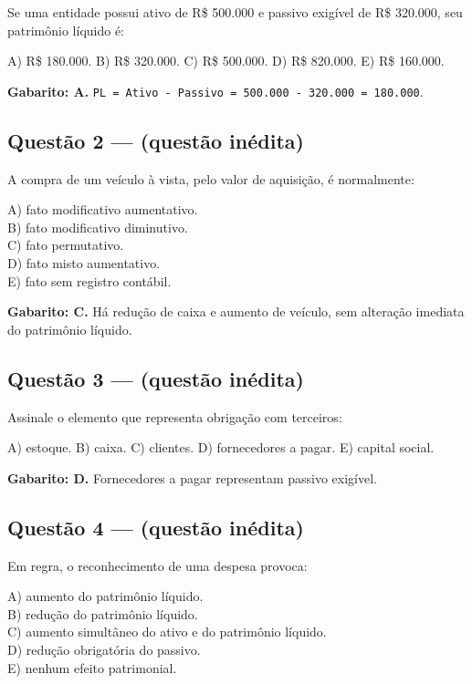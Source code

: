 \documentclass[11pt,a4paper]{article}
\begin{document}
Se uma entidade possui ativo de R\$ 500.000 e passivo exigível de R\$ 320.000, seu patrimônio líquido é:

A) R\$ 180.000. B) R\$ 320.000. C) R\$ 500.000. D) R\$ 820.000. E) R\$ 160.000.

\begin{alerta}
\textbf{Gabarito: A.} \texttt{PL = Ativo - Passivo = 500.000 - 320.000 = 180.000}.
\end{alerta}

\subsection*{Questão 2 — (questão inédita)}

A compra de um veículo à vista, pelo valor de aquisição, é normalmente:

A) fato modificativo aumentativo. \\ B) fato modificativo diminutivo. \\ C) fato permutativo. \\ D) fato misto aumentativo. \\ E) fato sem registro contábil.

\begin{alerta}
\textbf{Gabarito: C.} Há redução de caixa e aumento de veículo, sem alteração imediata do patrimônio líquido.
\end{alerta}

\subsection*{Questão 3 — (questão inédita)}

Assinale o elemento que representa obrigação com terceiros:

A) estoque. B) caixa. C) clientes. D) fornecedores a pagar. E) capital social.

\begin{alerta}
\textbf{Gabarito: D.} Fornecedores a pagar representam passivo exigível.
\end{alerta}

\subsection*{Questão 4 — (questão inédita)}

Em regra, o reconhecimento de uma despesa provoca:

A) aumento do patrimônio líquido. \\ B) redução do patrimônio líquido. \\ C) aumento simultâneo do ativo e do patrimônio líquido. \\ D) redução obrigatória do passivo. \\ E) nenhum efeito patrimonial.
\end{document}
